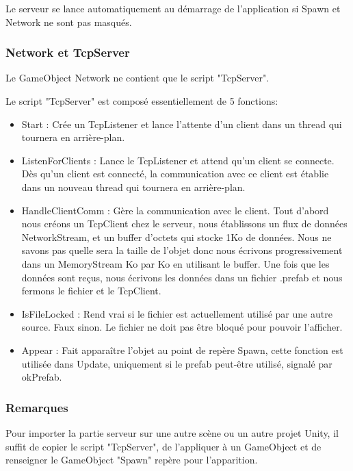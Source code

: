 \documentclass[a4paper,11pt]{article}
\begin{document}
		Le serveur se lance automatiquement au démarrage de l'application si Spawn et Network ne sont pas masqués.
		\subsubsection{Network et TcpServer}
			Le GameObject Network ne contient que le script "TcpServer".
			
			Le script "TcpServer" est composé essentiellement de 5 fonctions:
			\begin{itemize}
				\item Start : Crée un TcpListener et lance l'attente d'un client dans un thread qui tournera en arrière-plan.
				
				\item ListenForClients : Lance le TcpListener et attend qu'un client se connecte. Dès qu'un client est connecté, la communication avec ce client est établie dans un nouveau thread qui tournera en arrière-plan.
				
				\item HandleClientComm : Gère la communication avec le client. Tout d'abord nous créons un TcpClient chez le serveur, nous établissons un flux de données NetworkStream, et un buffer d'octets qui stocke 1Ko de données. Nous ne savons pas quelle sera la taille de l'objet donc nous écrivons progressivement dans un MemoryStream Ko par Ko en utilisant le buffer.
				Une fois que les données sont reçus, nous écrivons les données dans un fichier .prefab et nous fermons le fichier et le TcpClient.
				
				\item IsFileLocked : Rend vrai si le fichier est actuellement utilisé par une autre source. Faux sinon. Le fichier ne doit pas être bloqué pour pouvoir l'afficher.
				
				\item Appear : Fait apparaître l'objet au point de repère Spawn, cette fonction est utilisée dans Update, uniquement si le prefab peut-être utilisé, signalé par okPrefab.
			\end{itemize}
			
		\subsubsection{Remarques}
			Pour importer la partie serveur sur une autre scène ou un autre projet Unity, il suffit de copier le script "TcpServer", de l'appliquer à un GameObject et de renseigner le GameObject "Spawn" repère pour l'apparition.
			
\end{document}
